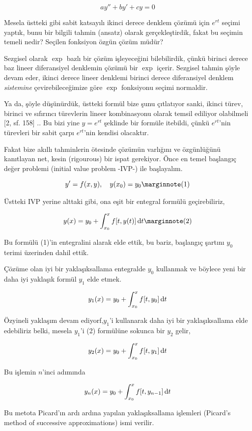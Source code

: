 \documentclass[12pt,fleqn]{article}\usepackage{../../common}
\begin{document}
$$
ay'' + by' + cy = 0
$$

Mesela üstteki gibi sabit katsayılı ikinci derece denklem çözümü için $e^{rt}$
seçimi yaptık, bunu bir bilgili tahmin (ansatz) olarak gerçekleştirdik, fakat bu
seçimin temeli nedir? Seçilen fonksiyon özgün çözüm müdür?

Sezgisel olarak $\exp$ bazlı bir çözüm işleyeceğini bilebilirdik, çünkü birinci
derece baz lineer diferansiyel denklemin çözümü bir $\exp$ içerir. Sezgisel
tahmin şöyle devam eder, ikinci derece lineer denklemi birinci derece
diferansiyel denklem {\em sistemine} çevirebileceğimize göre $\exp$ fonksiyonu
seçimi normaldir.

Ya da, şöyle düşünürdük, üstteki formül bize şunu çıtlatıyor sanki, ikinci
türev, birinci ve sıfırıncı türevlerin lineer kombinasyonu olarak temsil
ediliyor olabilmeli [2, sf. 158] .. Bu bizi yine $y = e^{rt}$ şeklinde bir
formüle itebildi, çünkü $e^{rt}$'nin türevleri bir sabit çarpı $e^{rt}$'nin
kendisi olacaktır.

Fakat bize akıllı tahminlerin ötesinde çözümün varlığını ve özgünlüğünü
kanıtlayan net, kesin (rigourous) bir ispat gerekiyor. Önce en temel başlangıç
değer problemi (initial value problem -IVP-) ile başlayalım.

$$
y' = f(x,y), \quad y(x_0) = y_0
\mlabel{1}
$$

Üstteki IVP yerine alttaki gibi, ona eşit bir entegral formülü geçirebiliriz,

$$
y(x) = y_0 + \int_{x_0}^{x} f[t, y(t)] \ud t
\mlabel{2}
$$

Bu formülü (1)'in entegralini alarak elde ettik, bu bariz, başlangıç şartını
$y_0$ terimi üzerinden dahil ettik.

Çözüme olan iyi bir yaklaşıksallama entegralde $y_0$ kullanmak ve böylece
yeni bir daha iyi yaklaşık formül $y_1$ elde etmek.

$$
y_1(x) = y_0 + \int_{x_0}^{x} f[t, y_0] \,\mathrm{d} t
$$

Özyineli yaklaşım devam ediyorf,$y_1$'i kullanarak daha iyi bir yaklaşıksallama
elde edebiliriz belki, mesela $y_1$'i (2) formülüne sokunca bir $y_2$ gelir,

$$
y_2(x) = y_0 + \int_{x_0}^{x} f[t, y_1] \,\mathrm{d} t
$$

Bu işlemin $n$'inci adımında

$$
y_{n}(x) = y_0 + \int_{x_0}^{x} f[t, y_{n-1}] \,\mathrm{d} t
$$

Bu metota Picard'ın ardı ardına yapılan yaklaşıksallama işlemleri (Picard's
method of successive approximations) ismi verilir.
\end{document}
